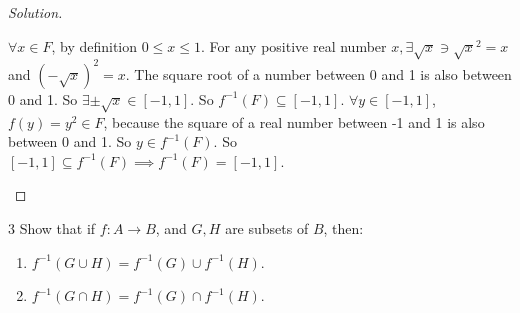 \documentclass{article}
\newenvironment{solution}
{\renewcommand\qedsymbol{$\blacksquare$}\begin{proof}[Solution]}
{\end{proof}}
\begin{document}
\begin{solution}
\begin{enumerate}
        $\forall x \in F$, by definition $0 \leq x \leq 1$. For any positive real number $x, \exists \sqrt{x} \ni \sqrt{x}^2 = x$ and $(-\sqrt{x})^2 = x$. The square root of a number between 0 and 1 is also between 0 and 1. So $\exists \pm\sqrt{x} \in [-1, 1]$. So $f^{-1}(F) \subseteq [-1, 1]$. $\forall y \in [-1, 1]$, $f(y) = y^2 \in F$, because the square of a real number between -1 and 1 is also between 0 and 1. So $y \in f^{-1}(F)$. So $[-1, 1] \subseteq f^{-1}(F) \implies f^{-1}(F) = [-1, 1]$.           
    \end{enumerate}
    
\end{solution}


\bigskip

\begin{PROB}{3}\label{Problem 3.}
    Show that if $f: A \rightarrow B$, and $G, H$ are subsets of $B$, then:

    \begin{enumerate}
        \item $f^{-1}(G \cup H)=f^{-1}(G) \cup f^{-1}(H)$.
        \item $f^{-1}(G \cap H)=f^{-1}(G) \cap f^{-1}(H)$.
    \end{enumerate}
\end{PROB}
\end{document}
